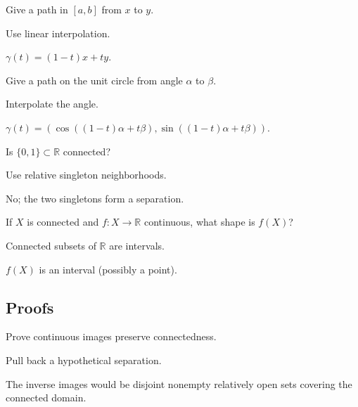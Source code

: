 \begin{exercise}\label{exr:ii07-expand-02}
Give a path in \([a,b]\) from \(x\) to \(y\).
\end{exercise}
\begin{hint}
Use linear interpolation.
\end{hint}
\begin{solution}
\(\gamma(t)=(1-t)x+ty\).
\end{solution}

\begin{exercise}\label{exr:ii07-expand-03}
Give a path on the unit circle from angle \(\alpha\) to \(\beta\).
\end{exercise}
\begin{hint}
Interpolate the angle.
\end{hint}
\begin{solution}
\(\gamma(t)=(\cos((1-t)\alpha+t\beta),\sin((1-t)\alpha+t\beta))\).
\end{solution}

\begin{exercise}\label{exr:ii07-expand-04}
Is \(\{0,1\}\subset\mathbb R\) connected?
\end{exercise}
\begin{hint}
Use relative singleton neighborhoods.
\end{hint}
\begin{solution}
No; the two singletons form a separation.
\end{solution}

\begin{exercise}\label{exr:ii07-expand-05}
If \(X\) is connected and \(f:X\to\mathbb R\) continuous, what shape is \(f(X)\)?
\end{exercise}
\begin{hint}
Connected subsets of \(\mathbb R\) are intervals.
\end{hint}
\begin{solution}
\(f(X)\) is an interval (possibly a point).
\end{solution}

\subsection*{Proofs}

\begin{exercise}\label{exr:ii07-expand-06}
Prove continuous images preserve connectedness.
\end{exercise}
\begin{hint}
Pull back a hypothetical separation.
\end{hint}
\begin{solution}
The inverse images would be disjoint nonempty relatively open sets covering the connected domain.
\end{solution}

